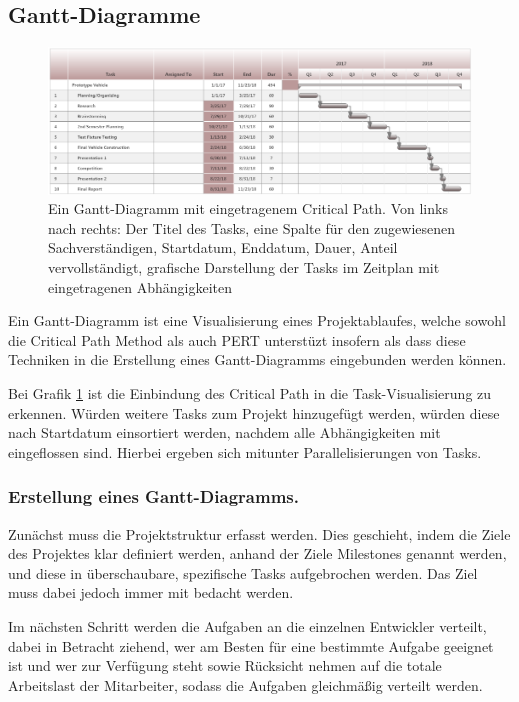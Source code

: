 	\subsection{Gantt-Diagramme}
		\label{ssec:gantt}
		\begin{figure}[ht]
			\begin{center}
				\includegraphics[width=\textwidth]{images/gantt2.png}
				\caption{Ein Gantt-Diagramm mit eingetragenem Critical Path. Von links nach rechts: Der Titel des Tasks, eine Spalte für den zugewiesenen Sachverständigen, Startdatum, Enddatum, Dauer, Anteil vervollständigt, grafische Darstellung der Tasks im Zeitplan mit eingetragenen Abhängigkeiten}
				\label{img:gantt}
			\end{center}
		\end{figure}
		Ein Gantt-Diagramm ist eine Visualisierung eines Projektablaufes, welche sowohl die Critical Path Method als auch PERT unterstüzt insofern als dass diese Techniken in die Erstellung eines Gantt-Diagramms eingebunden werden können.
		
		Bei Grafik \ref{img:gantt} ist die Einbindung des Critical Path in die Task-Visualisierung zu erkennen.
		Würden weitere Tasks zum Projekt hinzugefügt werden, würden diese nach Startdatum einsortiert werden, nachdem alle Abhängigkeiten mit eingeflossen sind.
		Hierbei ergeben sich mitunter Parallelisierungen von Tasks.
		
		\subsubsection{Erstellung eines Gantt-Diagramms.}
			\label{sssec:gantt-howto}
			Zunächst muss die Projektstruktur erfasst werden.
			Dies geschieht, indem die Ziele des Projektes klar definiert werden, anhand der Ziele Milestones genannt werden, und diese in überschaubare, spezifische Tasks aufgebrochen werden.
			Das Ziel muss dabei jedoch immer mit bedacht werden.
	
			Im nächsten Schritt werden die Aufgaben an die einzelnen Entwickler verteilt, dabei in Betracht ziehend, wer am Besten für eine bestimmte Aufgabe geeignet ist und wer zur Verfügung steht sowie Rücksicht nehmen auf die totale Arbeitslast der Mitarbeiter, sodass die Aufgaben gleichmäßig verteilt werden.
			
